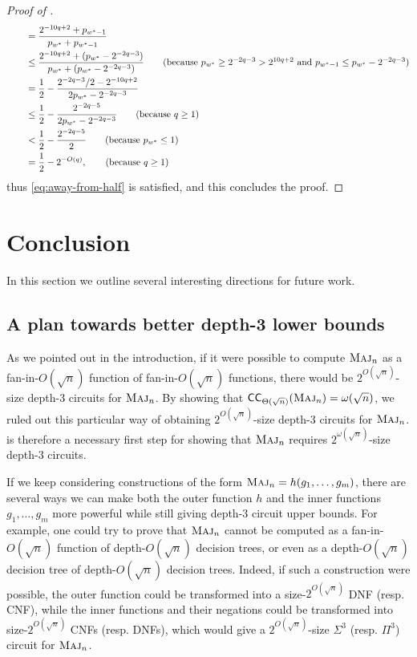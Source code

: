 \documentclass[10pt,a4paper]{article}
\theoremstyle{definition}
\theoremstyle{remark}
\newcommand{\mathsc}[1]{{\normalfont\textsc{#1}}}
\DeclareMathOperator{\Maj}{\mathsc{Maj}}
\newcommand{\myw}{{w^*}}
\newcommand{\CC}{\mathsf{CC}}
\begin{document}
\begin{proof}[Proof of ]
\begin{align*}
&\qquad= \frac{2^{-10q+2} + p_{\myw-1}}{p_{\myw}+p_{\myw-1}}\\
&\qquad\leq \frac{2^{-10q+2} + (p_\myw - 2^{-2q-3})}{p_\myw + (p_\myw-2^{-2q-3})}\tag{because $p_\myw \geq 2^{-2q-3} > 2^{10q+2}$ and $p_{\myw-1} \leq p_{\myw}-2^{-2q-3}$}\\
&\qquad= \frac{1}{2} - \frac{2^{-2q-3}/2 - 2^{-10q+2}}{2p_\myw-2^{-2q-3}}\\
&\qquad\leq \frac{1}{2} - \frac{2^{-2q-5}}{2p_\myw-2^{-2q-3}}\tag{because $q \geq 1$}\\
&\qquad< \frac{1}{2} - \frac{2^{-2q-5}}{2}\tag{because $p_\myw \leq 1$}\\
&\qquad= \frac{1}{2} - 2^{-O(q)},\tag{because $q \geq 1$}
\end{align*}
thus \eqref{eq:away-from-half} is satisfied, and this concludes the proof.
\end{proof}

\section{Conclusion}\label{sec:conclusion}
In this section we outline several
interesting directions for future work.

\subsection{A plan towards better depth-3 lower bounds}
\label{subsec:depth3-plan}
As we pointed out in the introduction, if it were possible to compute $\Maj_n$ as a fan-in-$O(\sqrt{n})$ function of fan-in-$O(\sqrt{n})$ functions, there would be $2^{O(\sqrt{n})}$-size depth-3 circuits for $\Maj_n$.
By showing that $\CC_{\Theta(\sqrt{n})}(\Maj_n) = \omega(\sqrt{n})$, we ruled out this particular way of obtaining $2^{O(\sqrt{n})}$-size depth-3 circuits for $\Maj_n$.
 is therefore a necessary first step for showing that $\Maj_n$ requires $2^{\omega(\sqrt{n})}$-size depth-3 circuits.

If we keep considering constructions of the form $\Maj_n = h(g_1, \ldots, g_m)$, there are several ways we can make both the outer function $h$ and the inner functions $g_1, \ldots, g_m$ more powerful while still giving depth-3 circuit upper bounds.
For example, one could try to prove that $\Maj_n$ cannot be computed as a fan-in-$O(\sqrt{n})$ function of depth-$O(\sqrt{n})$ decision trees,
or even as a depth-$O(\sqrt{n})$ decision tree of depth-$O(\sqrt{n})$ decision trees.
Indeed, if such a construction were possible, the outer function could be transformed into a size-$2^{O(\sqrt{n})}$ DNF (resp. CNF), while the inner functions and their negations could be transformed into size-$2^{O(\sqrt{n})}$  CNFs (resp. DNFs), which would give a $2^{O(\sqrt{n})}$-size $\Sigma^3$ (resp. $\Pi^3$) circuit for $\Maj_n$.
\end{document}

